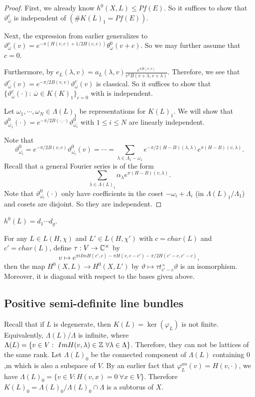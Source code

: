 \begin{proof}
First, we already know $h^0(X,L)\leq Pf(E)$. So it suffices to show that $\vartheta_{\overline{\omega}}^c$ is independent of $(\# K(L)_1=Pf(E))$.

Next, the expression from earlier generalizes to $\vartheta_{\overline{\omega}}^c(v)=e^{-\pi(H(v,c)+1/2H(c,c))}\theta_{\overline{\omega}}^0(v+c)$. So we may further assume that $c=0$.

Furthermore, by $e_L(\lambda,v)=a_L(\lambda,v)\frac{e^{\pi B(v,v)}}{e^\pi B(v+\lambda,v+\lambda)}$. Therefore, we see that $\vartheta_{\overline{\omega}}^c(v)=e^{-\pi/2 B(v,v)}\vartheta_{\overline{\omega}}^c(v)$ is classical. So it suffices to show that $\{\vartheta_{\overline{\omega}}^c(\cdot):\ \overline{\omega}\in K(K)_1\}_{c=0}$ with is independent.

Let $\omega_1,\cdots,\omega_N\in \Lambda(L)_1$ be representations for $K(L)_1$. We will show that $\vartheta_{\overline{\omega_1}}^0(\cdot)=e^{-\pi/2 B(\cdot,\cdot)}\vartheta_{\overline{\omega_i}}^0$ with $1\leq i\leq N$ are linearly independent. 

Note that 
$$\vartheta_{\overline{\omega_i}}^0=e^{-\pi/2B(v,v)}\vartheta_{\overline{\omega_i}}^0(v)=\cdots
=\sum_{\lambda\in \Lambda_1-\omega_1} e^{-\pi/2(H-B)(\lambda,\lambda)}e^{\pi (H-B)(v,\lambda)}.$$
Recall that a general Fourier series is of the form
$$\sum_{\lambda\in \Lambda(L)_1} \alpha_\lambda e^{\pi (H-B)(v,\lambda)}.$$
Note that $\vartheta_{\overline{\omega_i}}^0(\cdot)$ only have coefficients in the coset $-\omega_i+\Lambda_i$ (in $\Lambda(L)_1/\Lambda_1$) and cosets are disjoint. So they are independent. 
\end{proof}



\begin{corollary}
$h^0(L)=d_1\cdots d_g$.
\end{corollary}

\begin{corollary}
For any $L\in L(H,\chi)$ and $L'\in L(H,\chi')$ with $c=char(L)$ and $c'=char(L)$, define $\tau:V\to {\mathbb C}^\times$ by 
$$v\mapsto e^{\pi i Im H(c',c)-\pi H(v,c-c')-\pi/2 H(c'-c,c'-c)},$$
then the map $H^0(X,L)\to H^0(X,L')$ by $\vartheta\mapsto \tau t_{c'-c}^\times \vartheta$ is an isomorphism. Moreover, it is diagonal with respect to the bases given above. 
\end{corollary}

\subsection{Positive semi-definite line bundles}
Recall that if $L$ is degenerate, then $K(L)=\ker(\varphi_L)$ is not finite. Equivalently, $\Lambda(L)/\Lambda$ is infinite, where $\Lambda(L)=\{v\in V:\ Im H(v,\lambda)\in {\mathbb Z}\ \forall \lambda\in \Lambda\}$. Therefore, they can not be lattices of the same rank.
Let $\Lambda(L)_0$ be the connected component of $\Lambda(L)$ containing $0$,m which is also a subspace of $V$. By an earlier fact that $\varphi_L^{an}(v)=H(v,\cdot)$, we have $\Lambda(L)_0=\{v\in V: H(v,x)=0\ \forall x\in V\}$. Therefore $K(L)_0=\Lambda(L)_0/\Lambda(L)_0\cap \Lambda$ is a subtorus of $X$. 


